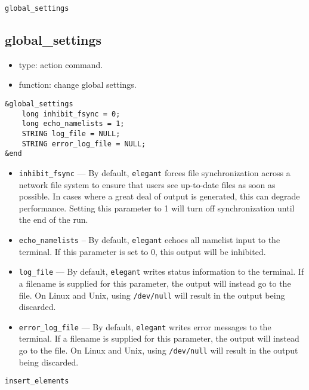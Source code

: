 \documentclass[11pt]{article}
\begin{document}
\begin{latexonly}
\newpage
\begin{center}{\Large\verb|global_settings|}\end{center}
\end{latexonly}
\subsection{global\_settings \label{subsec:globalsettings}}

\begin{itemize}
\item type: action command.  
\item function: change global settings.
\end{itemize}

\begin{verbatim}
&global_settings
    long inhibit_fsync = 0;
    long echo_namelists = 1;
    STRING log_file = NULL;
    STRING error_log_file = NULL;
&end
\end{verbatim}

\begin{itemize}
\item \verb|inhibit_fsync| --- By default, \verb|elegant| forces file synchronization across a network file system
  to ensure that users see up-to-date files as soon as possible.  In cases where a great deal of output is generated,
  this can degrade performance.  Setting this parameter to 1 will turn off synchronization until the end of the run.
\item \verb|echo_namelists| -- By default, \verb|elegant| echoes all namelist input to the terminal.  If this parameter
  is set to 0, this output will be inhibited.
\item \verb|log_file| --- By default, \verb|elegant| writes status information to the terminal.  If a filename is supplied
  for this parameter, the output will instead go to the file.  On Linux and Unix, using \verb|/dev/null| will result in 
  the output being discarded.
\item \verb|error_log_file| --- By default, \verb|elegant| writes error messages to the terminal.  If a filename is supplied
  for this parameter, the output will instead go to the file.  On Linux and Unix, using \verb|/dev/null| will result in 
  the output being discarded.
\end{itemize}

\begin{latexonly}
\newpage
\begin{center}{\Large\verb|insert_elements|}\end{center}
\end{latexonly}
\end{document}
